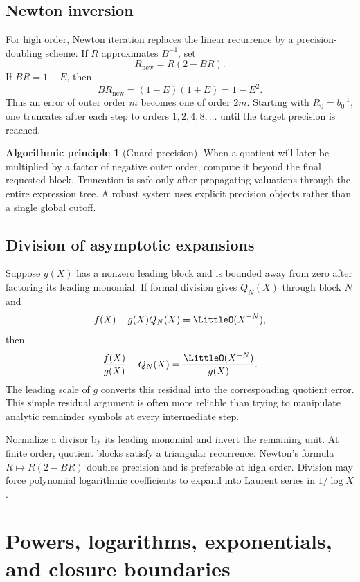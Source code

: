 \documentclass[11pt,oneside]{book}
\theoremstyle{definition}
\newtheorem{algorithmicprinciple}[theorem]{Algorithmic principle}
\theoremstyle{remark}
\begin{document}
\section{Newton inversion}
For high order, Newton iteration replaces the linear recurrence by a
precision-doubling scheme.  If $R$ approximates $B^{-1}$, set
\begin{equation}\label{eq:newton-reciprocal}
 R_{\mathrm{new}}=R(2-BR).
\end{equation}
If $BR=1-E$, then
\[
 BR_{\mathrm{new}}=(1-E)(1+E)=1-E^2.
\]
Thus an error of outer order $m$ becomes one of order $2m$.  Starting with
$R_0=b_0^{-1}$, one truncates after each step to orders
$1,2,4,8,\ldots$ until the target precision is reached.

\begin{algorithmicprinciple}[Guard precision]
When a quotient will later be multiplied by a factor of negative outer order,
compute it beyond the final requested block.  Truncation is safe only after
propagating valuations through the entire expression tree.  A robust system
uses explicit precision objects rather than a single global cutoff.
\end{algorithmicprinciple}

\section{Division of asymptotic expansions}
Suppose $g(X)$ has a nonzero leading block and is bounded away from zero after
factoring its leading monomial.  If formal division gives
$Q_N(X)$ through block $N$ and
\[
 f(X)-g(X)Q_N(X)=\LittleO(X^{-N}),
\]
then
\[
 \frac{f(X)}{g(X)}-Q_N(X)
 =\frac{\LittleO(X^{-N})}{g(X)}.
\]
The leading scale of $g$ converts this residual into the corresponding
quotient error.  This simple residual argument is often more reliable than
trying to manipulate analytic remainder symbols at every intermediate step.

\begin{summarybox}
Normalize a divisor by its leading monomial and invert the remaining unit.
At finite order, quotient blocks satisfy a triangular recurrence.  Newton's
formula $R\mapsto R(2-BR)$ doubles precision and is preferable at high order.
Division may force polynomial logarithmic coefficients to expand into Laurent
series in $1/\log X$.
\end{summarybox}


\chapter{Powers, logarithms, exponentials, and closure boundaries}
\label{ch:powers}
\end{document}
